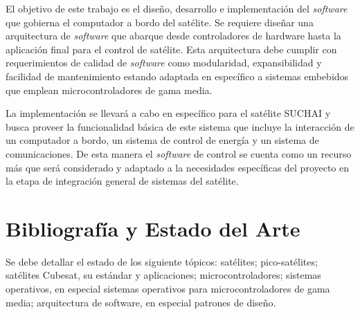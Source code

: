 \documentclass[11pt,letterpaper]{article}
\begin{document}
El objetivo de este trabajo es el diseño, desarrollo e implementación del \textit{software} que gobierna el computador a bordo del satélite. Se requiere diseñar una arquitectura de \textit{software} que abarque desde controladores de hardware hasta la aplicación final para el control de satélite. Esta arquitectura debe cumplir con requerimientos de calidad de \textit{software} como modularidad, expansibilidad y facilidad de mantenimiento estando adaptada en específico a sistemas embebidos que emplean microcontroladores de gama media.

La implementación se llevará a cabo en específico para el satélite SUCHAI y busca proveer la funcionalidad básica de este sistema que incluye la interacción de un computador a bordo, un sistema de control de energía y un sistema de comunicaciones. De esta manera el \textit{software} de control se cuenta como un recurso más que será considerado y adaptado a la necesidades específicas del proyecto en la etapa de integración general de sistemas del satélite.

\section{Bibliografía y Estado del Arte}

Se debe detallar el estado de los siguiente tópicos: satélites; pico-satélites; satélites Cubesat, su estándar y aplicaciones; microcontroladores; sistemas operativos, en especial sistemas operativos para microcontroladores de gama media; arquitectura de software, en especial patrones de diseño.
\end{document}
